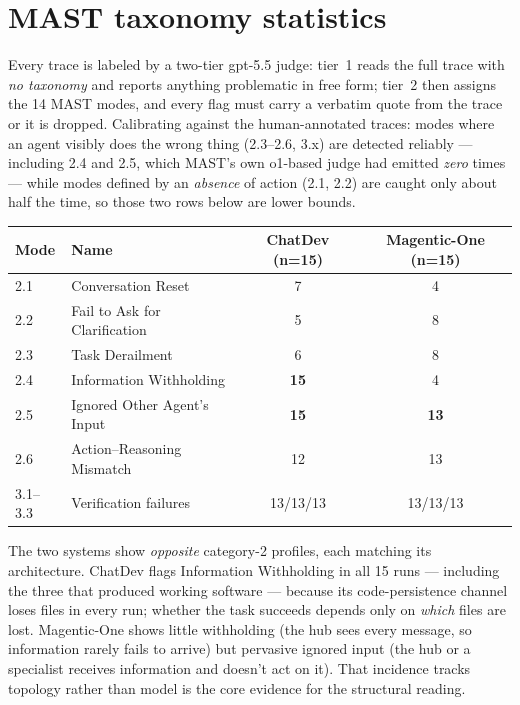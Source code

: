 \documentclass[10pt]{article}
\begin{document}
\section{MAST taxonomy statistics}
Every trace is labeled by a two-tier gpt-5.5 judge: tier~1 reads the full
trace with \emph{no taxonomy} and reports anything problematic in free form;
tier~2 then assigns the 14 MAST modes, and every flag must carry a verbatim
quote from the trace or it is dropped. Calibrating against the
human-annotated traces: modes where an agent visibly does the wrong thing
(2.3--2.6, 3.x) are detected reliably --- including 2.4 and 2.5, which
MAST's own o1-based judge had emitted \emph{zero} times --- while modes
defined by an \emph{absence} of action (2.1, 2.2) are caught only about half
the time, so those two rows below are lower bounds.

\begin{center}\small\renewcommand{\arraystretch}{0.95}%
\begin{tabular}{llcc}\toprule
Mode & Name & ChatDev (n=15) & Magentic-One (n=15)\\\midrule
2.1 & Conversation Reset & 7 & 4\\
2.2 & Fail to Ask for Clarification & 5 & 8\\
2.3 & Task Derailment & 6 & 8\\
2.4 & Information Withholding & \textbf{15} & 4\\
2.5 & Ignored Other Agent's Input & \textbf{15} & \textbf{13}\\
2.6 & Action--Reasoning Mismatch & 12 & 13\\
3.1--3.3 & Verification failures & 13/13/13 & 13/13/13\\
\bottomrule
\end{tabular}
\end{center}

The two systems show \emph{opposite} category-2 profiles, each matching its
architecture. ChatDev flags Information Withholding in all 15 runs ---
including the three that produced working software --- because its
code-persistence channel loses files in every run; whether the task succeeds
depends only on \emph{which} files are lost. Magentic-One shows little
withholding (the hub sees every message, so information rarely fails to
arrive) but pervasive ignored input (the hub or a specialist receives
information and doesn't act on it). That incidence tracks topology rather
than model is the core evidence for the structural reading.
\end{document}
